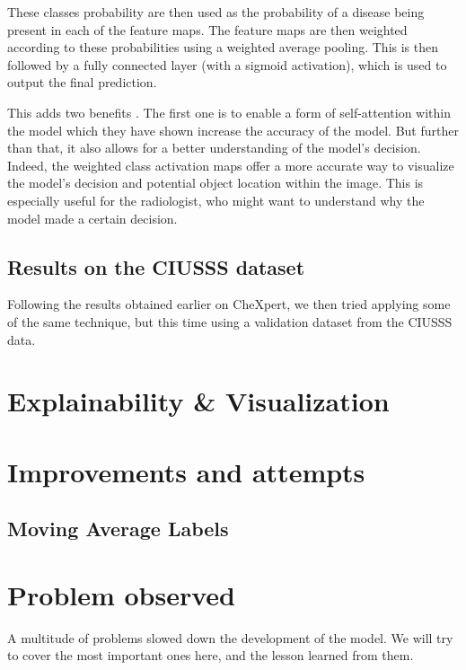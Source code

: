 \documentclass[11pt]{article}
\begin{document}
            These classes probability are then used as the probability of a disease being present in each of the feature maps. The feature maps are then
            weighted according to these probabilities using a weighted average pooling. This is then followed by a fully connected layer (with a sigmoid activation), which is used to output
            the final prediction.


            This adds two benefits . The first one is to enable a form of self-attention within the model which they have shown increase the accuracy of the model.
            But further than that, it also allows for a better understanding of the model's decision. Indeed, the weighted class activation maps offer a more accurate way to visualize the model's decision and potential object location
            within the image. This is especially useful for the radiologist, who might want to understand why the model made a certain decision.


        \subsection{Results on the CIUSSS dataset}


            Following the results obtained earlier on CheXpert, we then tried applying some of the same technique, but this time using a validation dataset from the CIUSSS data.





    \section{Explainability \& Visualization}



    \section{Improvements and attempts}

    \subsection{Moving Average Labels}


    \section{Problem observed}

    A multitude of problems slowed down the development of the model. We will try to cover the most
    important ones here, and the lesson learned from them.
\end{document}
